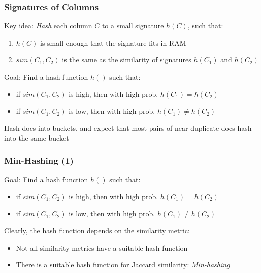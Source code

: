 \documentclass[svgnames]{beamer}
\begin{document}
\begin{frame} \frametitle{Signatures of Columns}

\begin{block}{Key idea:} 
\emph{Hash} each column $C$ to a small signature $h(C)$, such that:
\begin{enumerate}
  \item $h(C)$ is small enough that the signature fits in RAM
  \item $sim(C_1, C_2)$ is the same as the similarity of signatures $h(C_1)$ and $h(C_2)$
\end{enumerate}
\end{block}

\begin{block}{Goal:} 
Find a hash function $h()$ such that:
\begin{itemize}
\item if $sim(C_1,C_2)$ is high, then with high prob. $h(C_1) = h(C_2)$
\item if $sim(C_1,C_2)$ is low, then with high prob. $h(C_1) \neq h(C_2)$
\end{itemize}
\end{block}

Hash docs into buckets, and expect that most pairs of near duplicate docs hash into the same bucket
\end{frame}

  
\begin{frame} \frametitle{Min-Hashing (1)}

\begin{block}{Goal:} 
Find a hash function $h()$ such that:
\begin{itemize}
\item if $sim(C_1,C_2)$ is high, then with high prob. $h(C_1) = h(C_2)$
\item if $sim(C_1,C_2)$ is low, then with high prob. $h(C_1) \neq h(C_2)$
\end{itemize}
\end{block}

Clearly, the hash function depends on the similarity metric:

\begin{itemize}
  \item Not all similarity metrics have a suitable hash function
  \item There is a suitable hash function for Jaccard similarity: \emph{Min-hashing}
\end{itemize}  
\end{frame}
\end{document}
